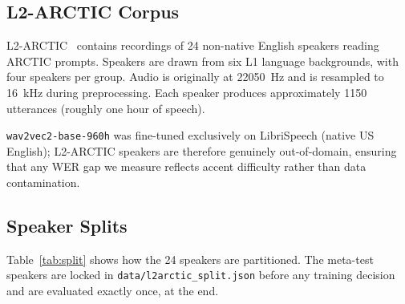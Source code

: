 \documentclass[12pt]{article}
\theoremstyle{plain}
\begin{document}
\subsection{L2-ARCTIC Corpus}

L2-ARCTIC~\cite{zhao2018l2arctic} contains recordings of 24 non-native English
speakers reading ARCTIC prompts.
Speakers are drawn from six L1 language backgrounds, with four speakers per group.
Audio is originally at \SI{22050}{\Hz} and is resampled to \SI{16}{\kHz} during
preprocessing.
Each speaker produces approximately 1150 utterances (roughly one hour of speech).

\texttt{wav2vec2-base-960h} was fine-tuned exclusively on LibriSpeech
(native US English); L2-ARCTIC speakers are therefore genuinely out-of-domain,
ensuring that any WER gap we measure reflects accent difficulty rather than
data contamination.

\subsection{Speaker Splits}

Table~\ref{tab:split} shows how the 24 speakers are partitioned.
The meta-test speakers are locked in \verb|data/l2arctic_split.json| before
any training decision and are evaluated exactly once, at the end.
\end{document}
